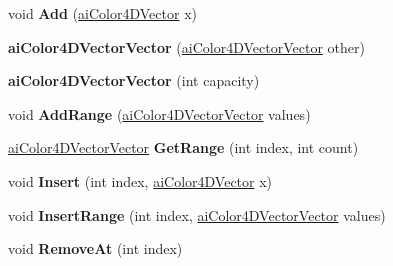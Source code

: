 \begin{DoxyCompactItemize}
\item 
\hypertarget{classai_color4_d_vector_vector_a2e182176f4fe911490d8f1fb85871257}{void {\bfseries Add} (\hyperlink{classai_color4_d_vector}{ai\+Color4\+D\+Vector} x)}\label{classai_color4_d_vector_vector_a2e182176f4fe911490d8f1fb85871257}

\item 
\hypertarget{classai_color4_d_vector_vector_a0d0416b990ce80ced631ca89ddeba53f}{{\bfseries ai\+Color4\+D\+Vector\+Vector} (\hyperlink{classai_color4_d_vector_vector}{ai\+Color4\+D\+Vector\+Vector} other)}\label{classai_color4_d_vector_vector_a0d0416b990ce80ced631ca89ddeba53f}

\item 
\hypertarget{classai_color4_d_vector_vector_a820d5df15d214bc829e28e938ae53ff2}{{\bfseries ai\+Color4\+D\+Vector\+Vector} (int capacity)}\label{classai_color4_d_vector_vector_a820d5df15d214bc829e28e938ae53ff2}

\item 
\hypertarget{classai_color4_d_vector_vector_a61f7014ebd119e025aae062b408da3a6}{void {\bfseries Add\+Range} (\hyperlink{classai_color4_d_vector_vector}{ai\+Color4\+D\+Vector\+Vector} values)}\label{classai_color4_d_vector_vector_a61f7014ebd119e025aae062b408da3a6}

\item 
\hypertarget{classai_color4_d_vector_vector_adef4704e1361569e2301cd4996edc8e7}{\hyperlink{classai_color4_d_vector_vector}{ai\+Color4\+D\+Vector\+Vector} {\bfseries Get\+Range} (int index, int count)}\label{classai_color4_d_vector_vector_adef4704e1361569e2301cd4996edc8e7}

\item 
\hypertarget{classai_color4_d_vector_vector_a805e021eaf65c1bd8f84632956eb262c}{void {\bfseries Insert} (int index, \hyperlink{classai_color4_d_vector}{ai\+Color4\+D\+Vector} x)}\label{classai_color4_d_vector_vector_a805e021eaf65c1bd8f84632956eb262c}

\item 
\hypertarget{classai_color4_d_vector_vector_a42c146ad74feaec5a6464f17e1b0b17b}{void {\bfseries Insert\+Range} (int index, \hyperlink{classai_color4_d_vector_vector}{ai\+Color4\+D\+Vector\+Vector} values)}\label{classai_color4_d_vector_vector_a42c146ad74feaec5a6464f17e1b0b17b}

\item 
\hypertarget{classai_color4_d_vector_vector_a7d346f368e08995e70372190b14d998d}{void {\bfseries Remove\+At} (int index)}\label{classai_color4_d_vector_vector_a7d346f368e08995e70372190b14d998d}


\end{DoxyCompactItemize}
